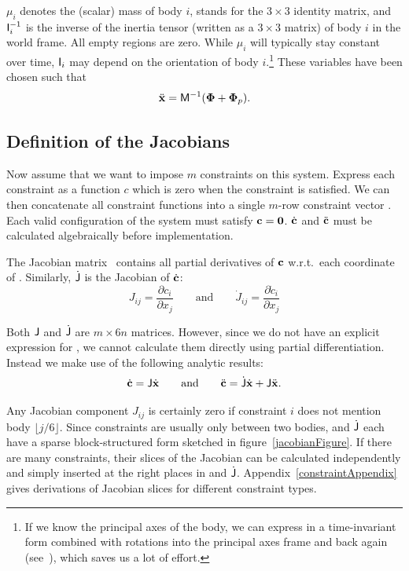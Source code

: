 $\mu_i$ denotes the (scalar) mass of body $i$,  stands for the $3\times3$
identity matrix, and $\mathsf{I}_i^{-1}$ is the inverse of the inertia tensor (written as a
$3\times3$ matrix) of body $i$ in the world frame. All empty regions are zero. While $\mu_i$
will typically stay constant over time, $\mathsf{I}_i$ may depend on the orientation of body
$i$.\footnote{If we know the principal axes of the body, we can express  in a time-invariant
form combined with rotations into the principal axes frame and back again
(see~\cite{BaraffWitkin:97}), which saves us a lot of effort.} These variables have been chosen
such that
\begin{equation}
\ddot{\ve{x}} = \m{M}^{-1} (\ve{\Phi} + \ve{\Phi}_p).
\end{equation}


\subsection{Definition of the Jacobians\label{jacDefinition}}

Now assume that we want to impose $m$ constraints on this system. Express each constraint as a function
$c$ which is zero when the constraint is satisfied.  We can then concatenate all
constraint functions into a single $m$-row constraint vector . Each valid configuration of
the system must satisfy $\ve{c} = \ve{0}$. $\dot{\ve{c}}$ and $\ddot{\ve{c}}$ must be calculated
algebraically before implementation.

The Jacobian matrix~\cite{RHB:02}  contains all partial derivatives of $\ve{c}$ w.r.t.\ each
coordinate of . Similarly, $\dot{\mathsf{J}}$ is the Jacobian of $\dot{\ve{c}}$:
\begin{equation}
J_{ij} = \frac{\partial c_i}{\partial x_j} \quad\quad\mathrm{and}\quad\quad
\dot{J}_{ij} = \frac{\partial \dot{c}_i}{\partial x_j}
\end{equation}

Both $\mathsf{J}$ and $\dot{\mathsf{J}}$ are $m \times 6n$ matrices. However, since we do not
have an explicit expression for , we cannot calculate them directly using
partial differentiation. Instead we make use of the following analytic results:
\begin{equation}
\label{cDotAndCDDot}
\dot{\ve{c}} = \m{J}\dot{\ve{x}} \quad\quad\mathrm{and}\quad\quad
\ddot{\ve{c}} = \dot{\m{J}}\dot{\ve{x}} + \m{J}\ddot{\ve{x}}.
\end{equation}

Any Jacobian component $J_{ij}$ is certainly zero if constraint $i$ does not mention body
$\lfloor j/6 \rfloor$. Since constraints are usually only between two bodies,  and
$\dot{\mathsf{J}}$ each have a sparse block-structured form sketched in figure~\ref{jacobianFigure}.
If there are many constraints, their slices of the Jacobian can be calculated independently and
simply inserted at the right places in  and $\dot{\mathsf{J}}$. Appendix~\ref{constraintAppendix}
gives derivations of Jacobian slices for different constraint types.


